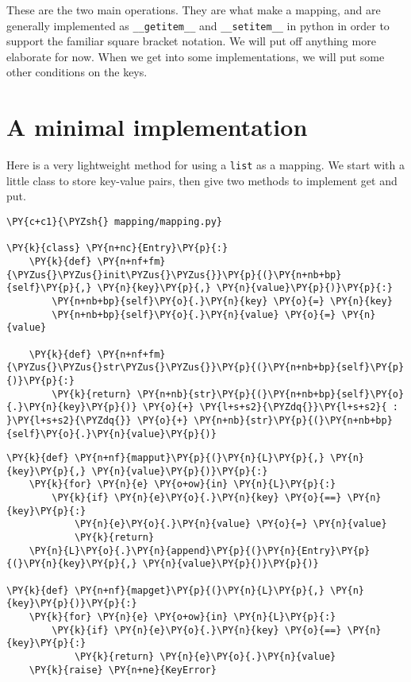 These are the two main operations.  They are what make a mapping, and are generally implemented as \texttt{\_\_getitem\_\_} and \texttt{\_\_setitem\_\_} in python in order to support the familiar square bracket notation.  We will put off anything more elaborate for now.  When we get into some implementations, we will put some other conditions on the keys.

\section{A minimal implementation}


Here is a very lightweight method for using a \texttt{list} as a mapping.  We start with a little class to store key-value pairs, then give two methods to implement get and put.

\begin{Verbatim}[commandchars=\\\{\}]
\PY{c+c1}{\PYZsh{} mapping/mapping.py}

\PY{k}{class} \PY{n+nc}{Entry}\PY{p}{:}
    \PY{k}{def} \PY{n+nf+fm}{\PYZus{}\PYZus{}init\PYZus{}\PYZus{}}\PY{p}{(}\PY{n+nb+bp}{self}\PY{p}{,} \PY{n}{key}\PY{p}{,} \PY{n}{value}\PY{p}{)}\PY{p}{:}
        \PY{n+nb+bp}{self}\PY{o}{.}\PY{n}{key} \PY{o}{=} \PY{n}{key}
        \PY{n+nb+bp}{self}\PY{o}{.}\PY{n}{value} \PY{o}{=} \PY{n}{value}

    \PY{k}{def} \PY{n+nf+fm}{\PYZus{}\PYZus{}str\PYZus{}\PYZus{}}\PY{p}{(}\PY{n+nb+bp}{self}\PY{p}{)}\PY{p}{:}
        \PY{k}{return} \PY{n+nb}{str}\PY{p}{(}\PY{n+nb+bp}{self}\PY{o}{.}\PY{n}{key}\PY{p}{)} \PY{o}{+} \PY{l+s+s2}{\PYZdq{}}\PY{l+s+s2}{ : }\PY{l+s+s2}{\PYZdq{}} \PY{o}{+} \PY{n+nb}{str}\PY{p}{(}\PY{n+nb+bp}{self}\PY{o}{.}\PY{n}{value}\PY{p}{)}
\end{Verbatim}


\begin{Verbatim}[commandchars=\\\{\}]
\PY{k}{def} \PY{n+nf}{mapput}\PY{p}{(}\PY{n}{L}\PY{p}{,} \PY{n}{key}\PY{p}{,} \PY{n}{value}\PY{p}{)}\PY{p}{:}
    \PY{k}{for} \PY{n}{e} \PY{o+ow}{in} \PY{n}{L}\PY{p}{:}
        \PY{k}{if} \PY{n}{e}\PY{o}{.}\PY{n}{key} \PY{o}{==} \PY{n}{key}\PY{p}{:}
            \PY{n}{e}\PY{o}{.}\PY{n}{value} \PY{o}{=} \PY{n}{value}
            \PY{k}{return}
    \PY{n}{L}\PY{o}{.}\PY{n}{append}\PY{p}{(}\PY{n}{Entry}\PY{p}{(}\PY{n}{key}\PY{p}{,} \PY{n}{value}\PY{p}{)}\PY{p}{)}

\PY{k}{def} \PY{n+nf}{mapget}\PY{p}{(}\PY{n}{L}\PY{p}{,} \PY{n}{key}\PY{p}{)}\PY{p}{:}
    \PY{k}{for} \PY{n}{e} \PY{o+ow}{in} \PY{n}{L}\PY{p}{:}
        \PY{k}{if} \PY{n}{e}\PY{o}{.}\PY{n}{key} \PY{o}{==} \PY{n}{key}\PY{p}{:}
            \PY{k}{return} \PY{n}{e}\PY{o}{.}\PY{n}{value}
    \PY{k}{raise} \PY{n+ne}{KeyError}
\end{Verbatim}



